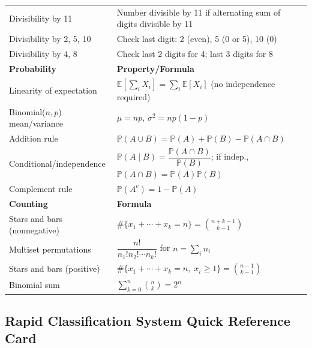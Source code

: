 \documentclass{article}
\begin{document}
\begin{center}
\begin{tabularx}{\textwidth}{|>{\raggedright\arraybackslash}X|>{\raggedright\arraybackslash}X|}
Divisibility by 11 & Number divisible by 11 if alternating sum of digits divisible by 11 \\
Divisibility by 2, 5, 10 & Check last digit: 2 (even), 5 (0 or 5), 10 (0) \\
Divisibility by 4, 8 & Check last 2 digits for 4; last 3 digits for 8 \\
\hline
\textbf{Probability} & \textbf{Property/Formula} \\
\hline
Linearity of expectation & $\mathbb{E}\!\left[\sum_i X_i\right]=\sum_i \mathbb{E}[X_i]$ (no independence required) \\
Binomial($n,p$) mean/variance & $\mu=np$, $\sigma^2=np(1-p)$ \\
Addition rule & $\mathbb{P}(A\cup B)=\mathbb{P}(A)+\mathbb{P}(B)-\mathbb{P}(A\cap B)$ \\
Conditional/independence & $\mathbb{P}(A\mid B)=\dfrac{\mathbb{P}(A\cap B)}{\mathbb{P}(B)}$; if indep., $\mathbb{P}(A\cap B)=\mathbb{P}(A)\mathbb{P}(B)$ \\
Complement rule & $\mathbb{P}(A^c)=1-\mathbb{P}(A)$ \\
\hline
\textbf{Counting} & \textbf{Formula} \\
\hline
Stars and bars (nonnegative) & $\#\{x_1+\cdots+x_k=n\}=\binom{n+k-1}{k-1}$ \\
Multiset permutations & $\dfrac{n!}{n_1!n_2!\cdots n_k!}$ for $n=\sum_i n_i$ \\
Stars and bars (positive) & $\#\{x_1+\cdots+x_k=n,\;x_i\ge1\}=\binom{n-1}{k-1}$ \\
Binomial sum & $\sum_{k=0}^n \binom{n}{k}=2^n$ \\
\hline
\end{tabularx}
\end{center}

\subsection{Rapid Classification System Quick Reference Card}
\end{document}
